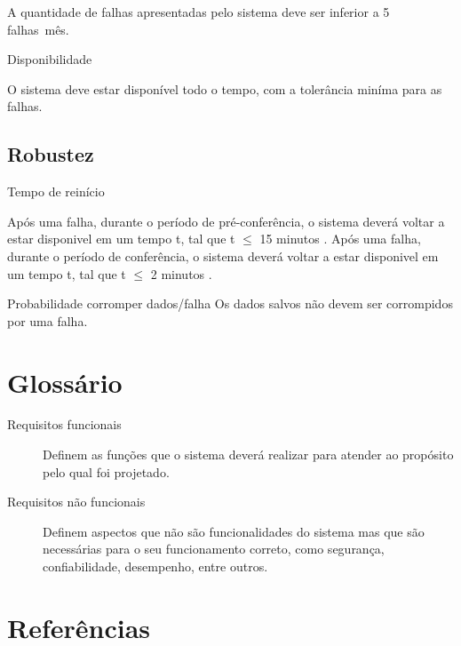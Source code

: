 \documentclass[letter]{article}
\begin{document}
A quantidade de falhas apresentadas pelo sistema deve ser inferior a 5 falhas\ mês.

\textbullet\hspace{1mm} Disponibilidade

O sistema deve estar disponível todo o tempo, com a tolerância miníma para as falhas.


\subsection{Robustez}
\textbullet\hspace{1mm} Tempo de reinício

Após uma falha, durante o período de pré-conferência, o sistema deverá voltar a estar disponivel em um tempo t, tal que t $\leq$ 15 minutos .
Após uma falha, durante o período de conferência, o sistema deverá voltar a estar disponivel em um tempo t, tal que t $\leq$ 2 minutos .

\textbullet\hspace{1mm} Probabilidade corromper dados/falha
Os dados salvos não devem ser corrompidos por uma falha.






\section{Glossário}
\begin{description}
\item[Requisitos funcionais] 
Definem as funções que o sistema deverá realizar para atender ao propósito pelo qual foi projetado.
\item [Requisitos não funcionais]
Definem aspectos que não são funcionalidades do sistema mas que são necessárias para o seu funcionamento
correto, como segurança, confiabilidade, desempenho, entre outros.
\end{description}

\section{Referências}
\end{document}
